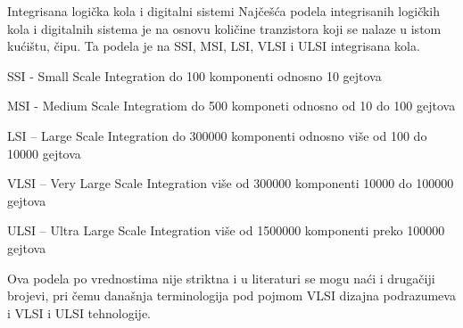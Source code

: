 \begin{frame}[label=03-s002]{Integrisana logička kola i digitalni sistemi}
\gusttekst
Najčešća podela integrisanih logičkih kola i digitalnih sistema je na osnovu količine tranzistora koji se nalaze u istom kućištu, čipu. Ta podela je na SSI, MSI, LSI, VLSI i ULSI integrisana kola.

SSI - Small Scale Integration do 100 komponenti odnosno 10 gejtova

MSI - Medium Scale Integratiom do 500 komponeti odnosno od 10 do 100 gejtova

LSI – Large Scale Integration do 300000 komponenti odnosno više od 100 do 10000 gejtova

VLSI – Very Large Scale Integration više od 300000 komponenti 10000 do 100000 gejtova

ULSI – Ultra Large Scale Integration više od 1500000 komponenti preko 100000 gejtova

Ova podela po vrednostima nije striktna i u literaturi se mogu naći i drugačiji brojevi, pri čemu današnja terminologija pod pojmom VLSI dizajna podrazumeva i VLSI i ULSI tehnologije.
\end{frame}
